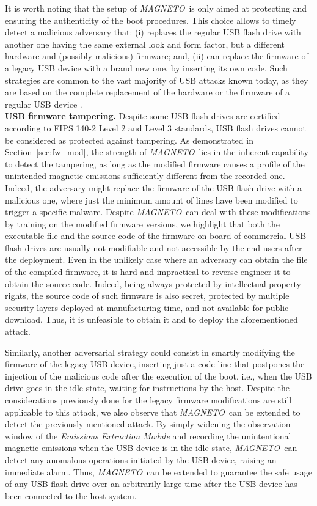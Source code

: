 \documentclass[acmsmall, authorversion]{acmart}
\newcommand{\sol}{\emph{MAGNETO}}
\begin{document}
\noindent
It is worth noting that the setup of \sol\ is only aimed at protecting and ensuring the authenticity of the boot procedures. This choice allows to timely detect a malicious adversary that: (i) replaces the regular USB flash drive with another one having the same external look and form factor, but a different hardware and (possibly malicious) firmware; and, (ii) can replace the firmware of a legacy USB device with a brand new one, by inserting its own code. Such strategies are common to the vast majority of USB attacks known today, as they are based on the complete replacement of the hardware or the firmware of a regular USB device \cite{Nissim2017}.
%
\\
%
{\bf USB firmware tampering.} Despite some USB flash drives are certified according to FIPS 140-2 Level 2 and Level 3 standards, USB flash drives cannot be considered as protected against tampering. As demonstrated in Section~\ref{sec:fw_mod}, the strength of \sol\ lies in the inherent capability to detect the tampering, as long as the modified firmware causes a profile of the unintended magnetic emissions sufficiently different from the recorded one.\\
Indeed, the adversary might replace the firmware of the USB flash drive with a malicious one, where just the minimum amount of lines have been modified to trigger a specific malware. Despite \sol\ can deal with these modifications by training on the modified firmware versions, we highlight that both the executable file and the source code of the firmware on-board of commercial USB flash drives are usually not modifiable and not accessible by the end-users after the deployment. Even in the unlikely case where an adversary can obtain the file of the compiled firmware, it is hard and impractical to reverse-engineer it to obtain the source code. Indeed, being always protected by intellectual property rights, the source code of such firmware is also secret, protected by multiple security layers deployed at manufacturing time, and not available for public download. Thus, it is unfeasible to obtain it and to deploy the aforementioned attack.

\noindent
Similarly, another adversarial strategy could consist in smartly modifying the firmware of the legacy USB device, inserting just a code line that postpones the injection of the malicious code after the execution of the boot, i.e., when the USB drive goes in the idle state, waiting for instructions by the host. 
Despite the considerations previously done for the legacy firmware modifications are still applicable to this attack, we also observe that \sol\ can be extended to detect the previously mentioned attack. By simply widening the observation window of the \emph{Emissions Extraction Module} and recording the unintentional magnetic emissions when the USB device is in the idle state, \sol\ can detect any anomalous operations initiated by the USB device, raising an immediate alarm. Thus, \sol\ can be extended to guarantee the safe usage of any USB flash drive over an arbitrarily large time after the USB device has been connected to the host system. 
\end{document}
